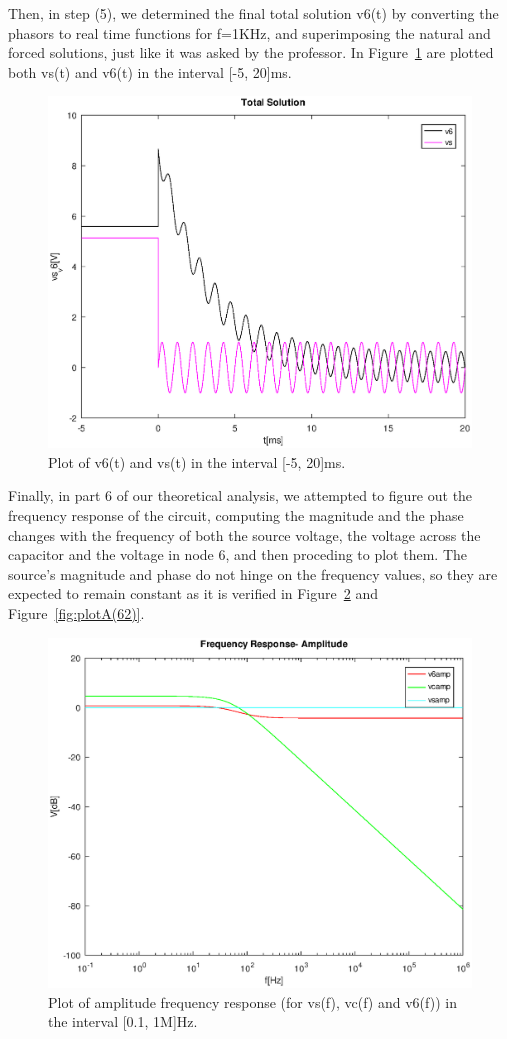 Then, in step (5), we determined the final total solution v6(t) by converting the phasors to real time functions for f=1KHz, and superimposing the natural and forced solutions, just like it was asked by the professor. In Figure~\ref{fig:plotA(5)} are plotted both vs(t) and v6(t) in the interval [-5, 20]ms.

\begin{figure}[h] \centering
\includegraphics[width=0.8\linewidth]{TotalSolution.eps}
\caption{Plot of v6(t) and vs(t) in the interval [-5, 20]ms.}
\label{fig:plotA(5)}
\end{figure}

Finally, in part 6 of our theoretical analysis, we attempted to figure out the frequency response of the circuit, computing the magnitude and the phase changes with the frequency of both the source voltage, the voltage across the capacitor and the voltage in node 6, and then proceding to plot them.
The source's magnitude and phase do not hinge on the frequency values, so they are expected to remain constant as it is verified in Figure~\ref{fig:plotA(61)} and Figure~\ref{fig:plotA(62)}.

\begin{figure}[h] \centering
\includegraphics[width=0.8\linewidth]{FrequencyResponseAmplitude.eps}
\caption{Plot of amplitude frequency response (for vs(f), vc(f) and v6(f)) in the interval [0.1, 1M]Hz.}
\label{fig:plotA(61)}
\end{figure}

